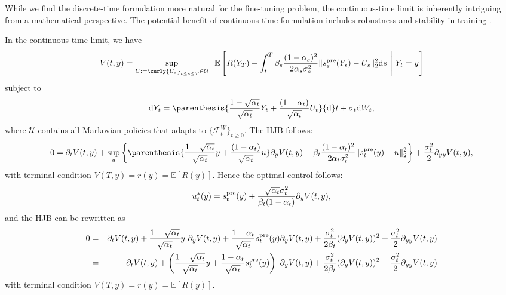 \documentclass{article}
\begin{document}
While we find the discrete-time formulation more natural for the fine-tuning problem, the continuous-time limit is inherently intriguing from a mathematical perspective. The potential benefit of continuous-time formulation includes robustness and stability in training \citep{zhao2024scores}.


In the continuous time limit, we have
\begin{eqnarray*}
 V(t,y)  =  \sup_{U:=\curly{U_s}_{t\leq s\leq T}\in \mathcal{U}} \;\; \mathbb{E}\left[R(Y_T) -  \int_t^T \beta_s \frac{(1-\alpha_s)^2}{2\alpha_s\sigma_s^2} \|s_s^{\rm pre}(Y_s)-U_s\|_2^2 {\rm d} s\,\,\Bigg|\,\,Y_t=y\right]
\end{eqnarray*}
subject to
\begin{align*}
    {\rm d} Y_t= \parenthesis{\frac{1-\sqrt{\alpha_t}}{\sqrt{\alpha_t}}Y_t + \frac{(1 - \alpha_t)}{\sqrt{\alpha_t}}U_t} {\rm d} t + \sigma_t {\rm d} W_t,
\end{align*}
where $\mathcal{U}$ contains all Markovian policies that adapts to $\{\mathcal{F}^W_t\}_{t\ge 0}$.
The HJB follows:
\begin{eqnarray*}
 0=   \partial_t V(t,y) + \sup_{u} \left\{\parenthesis{\frac{1-\sqrt{\alpha_t}}{\sqrt{\alpha_t}}y + \frac{(1 - \alpha_t)}{\sqrt{\alpha_t}}u} \partial_y V(t,y)- \beta_t \frac{(1-\alpha_t)^2}{2\alpha_t\sigma_t^2} \|s_t^{\rm pre}(y)-u\|_2^2\right\} + \frac{\sigma_t^2}{2}\partial_{yy}V(t,y),
\end{eqnarray*}
with terminal condition $V(T,y) = r(y) = \mathbb{E}[R(y)]$. Hence the optimal control follows:
\begin{eqnarray}\label{eq:continuous_time_control}
    u^*_t(y) = s^{\rm pre}_t(y) + \frac{\sqrt{\alpha_t}\sigma_t^2}{\beta_t (1-\alpha_t)}\partial_y V(t,y),
\end{eqnarray}
and the HJB can be rewritten as
\begin{eqnarray}
 0 &=&    \partial_t V(t,y) +  \frac{1-\sqrt{\alpha_t}}{\sqrt{\alpha_t}}y\,\,\partial_y V(t,y) + \frac{1-\alpha_t}{\sqrt{\alpha_t}} s^{\rm pre}_t(y)  \partial_y V(t,y)+ \frac{\sigma_t^2}{2\beta_t} (\partial_y V(t,y))^2+ \frac{\sigma_t^2}{2}\partial_{yy}V(t,y)\nonumber\\
 &=&    \partial_t V(t,y) +  \left(\frac{1-\sqrt{\alpha_t}}{\sqrt{\alpha_t}}y+  \frac{1-\alpha_t}{\sqrt{\alpha_t}} s^{\rm pre}_t(y)\right)\,\,  \partial_y V(t,y)+ \frac{\sigma_t^2}{2\beta_t} (\partial_y V(t,y))^2+ \frac{\sigma_t^2}{2}\partial_{yy}V(t,y)\label{eq:continuous_time_hjb}
\end{eqnarray}
with terminal condition $V(T,y) = r(y) = \mathbb{E}[R(y)]$. 
\end{document}
